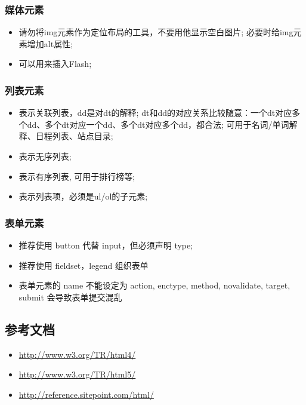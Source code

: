\documentclass[letterpaper,10pt,english]{sphinxmanual}
\begin{document}
\subsubsection{媒体元素}
\label{styleguide/html-coding-style:id9}\begin{itemize}
\item {}
 请勿将img元素作为定位布局的工具，不要用他显示空白图片; 必要时给img元素增加alt属性;

\item {}
 可以用来插入Flash;

\end{itemize}


\subsubsection{列表元素}
\label{styleguide/html-coding-style:id10}\begin{itemize}
\item {}
 表示关联列表，dd是对dt的解释; dt和dd的对应关系比较随意：一个dt对应多个dd、多个dt对应一个dd、多个dt对应多个dd，都合法; 可用于名词/单词解释、日程列表、站点目录;

\item {}
 表示无序列表;

\item {}
 表示有序列表, 可用于排行榜等;

\item {}
 表示列表项，必须是ul/ol的子元素;

\end{itemize}


\subsubsection{表单元素}
\label{styleguide/html-coding-style:id11}\begin{itemize}
\item {}
推荐使用 button 代替 input，但必须声明 type;

\item {}
推荐使用 fieldset，legend 组织表单

\item {}
表单元素的 name 不能设定为 action, enctype, method, novalidate, target, submit 会导致表单提交混乱

\end{itemize}


\subsection{参考文档}
\label{styleguide/html-coding-style:id12}\begin{itemize}
\item {}
\href{http://www.w3.org/TR/html4/}{http://www.w3.org/TR/html4/}

\item {}
\href{http://www.w3.org/TR/html5/}{http://www.w3.org/TR/html5/}

\item {}
\href{http://reference.sitepoint.com/html/}{http://reference.sitepoint.com/html/}

\end{itemize}
\end{document}
